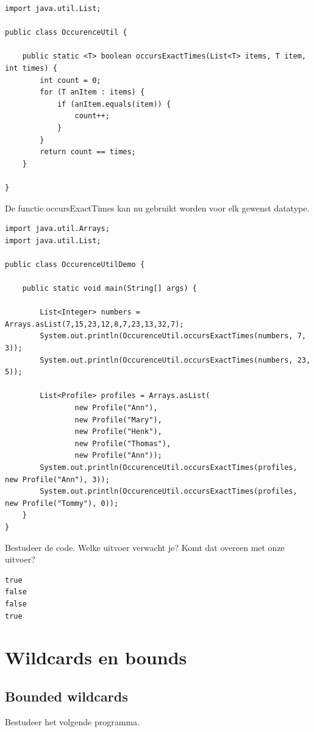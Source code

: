 \documentclass{tstextbook}
\begin{document}
\begin{lstlisting}
import java.util.List;

public class OccurenceUtil {

	public static <T> boolean occursExactTimes(List<T> items, T item, int times) {
		int count = 0;
		for (T anItem : items) {
			if (anItem.equals(item)) {
				count++;
			}
		}
		return count == times;
	}

}
\end{lstlisting}

De functie occursExactTimes kan nu gebruikt worden voor elk gewenst datatype.

\begin{lstlisting}
import java.util.Arrays;
import java.util.List;

public class OccurenceUtilDemo {

	public static void main(String[] args) {
		
		List<Integer> numbers = Arrays.asList(7,15,23,12,8,7,23,13,32,7);
		System.out.println(OccurenceUtil.occursExactTimes(numbers, 7, 3));
		System.out.println(OccurenceUtil.occursExactTimes(numbers, 23, 5));

		List<Profile> profiles = Arrays.asList(
				new Profile("Ann"),
				new Profile("Mary"),
				new Profile("Henk"),
				new Profile("Thomas"),
				new Profile("Ann"));
		System.out.println(OccurenceUtil.occursExactTimes(profiles, new Profile("Ann"), 3));
		System.out.println(OccurenceUtil.occursExactTimes(profiles, new Profile("Tommy"), 0));
	}
}
\end{lstlisting}

Bestudeer de code. Welke uitvoer verwacht je?
Komt dat overeen met onze uitvoer? 

\begin{verbatim}
true
false
false
true
\end{verbatim}

\section{Wildcards en bounds}

\subsection{Bounded wildcards}

Bestudeer het volgende programma.
\end{document}
